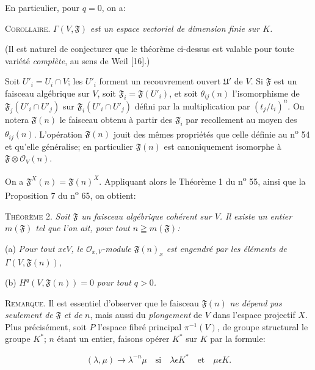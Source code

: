 En particulier, pour $q = 0$, on a:

\textsc{Corollaire}. $\Gamma(V, \mathfrak{F})$ \textit{est un espace vectoriel de dimension finie sur $K$.}

(Il est naturel de conjecturer que le théorème ci-dessus est valable pour toute variété \textit{complète}, au sens de Weil [16].)

Soit $U'_i = U_i \cap V$; les $U'_i$ forment un recouvrement ouvert $\mathfrak{U}'$ de $V$. Si $\mathfrak{F}$ est un faisceau algébrique sur $V$, soit $\mathfrak{F}_i = \mathfrak{F}(U'_i)$, et soit $\theta_{ij}(n)$ l'isomorphisme de $\mathfrak{F}_j(U'_i \cap U'_j)$ sur $\mathfrak{F}_i(U'_i \cap U'_j)$ défini par la multiplication par $(t_j/t_i)^n$. On notera $\mathfrak{F}(n)$ le faisceau obtenu à partir des $\mathfrak{F}_i$ par recollement au moyen des $\theta_{ij}(n)$. L'opération $\mathfrak{F}(n)$ jouit des mêmes propriétés que celle définie au n\textsuperscript{o} 54 et qu'elle généralise; en particulier $\mathfrak{F}(n)$ est canoniquement isomorphe à $\mathfrak{F} \otimes \mathcal{O}_V(n)$.

On a $\mathfrak{F}^X(n) = \mathfrak{F}(n)^X$. Appliquant alors le Théorème 1 du n\textsuperscript{o} 55, ainsi que la Proposition 7 du n\textsuperscript{o} 65, on obtient:

\textsc{Théorème} 2. \textit{Soit $\mathfrak{F}$ un faisceau algébrique cohérent sur $V$. Il existe un entier $m(\mathfrak{F})$ tel que l'on ait, pour tout $n \geqq m(\mathfrak{F})$:}

(a) \textit{Pour tout $x \epsilon V$, le $\mathcal{O}_{x,V}$-module $\mathfrak{F}(n)_x$ est engendré par les éléments de $\Gamma(V, \mathfrak{F}(n))$,}

(b) $H^q(V, \mathfrak{F}(n)) = 0$ \textit{pour tout $q > 0$.}

\textsc{Remarque}. Il est essentiel d'observer que le faisceau $\mathfrak{F}(n)$ \textit{ne dépend pas seulement de} $\mathfrak{F}$ \textit{et de} $n$, mais aussi du \textit{plongement} de $V$ dans l'espace projectif $X$. Plus précisément, soit $P$ l'espace fibré principal $\pi^{-1}(V)$, de groupe structural le groupe $K^*$; $n$ étant un entier, faisons opérer $K^*$ sur $K$ par la formule:

\begin{equation*}
(\lambda, \mu) \to \lambda^{-n}\mu \quad \mathrm{si} \quad \lambda \epsilon K^* \quad \mathrm{et} \quad \mu \epsilon K.
\end{equation*}



